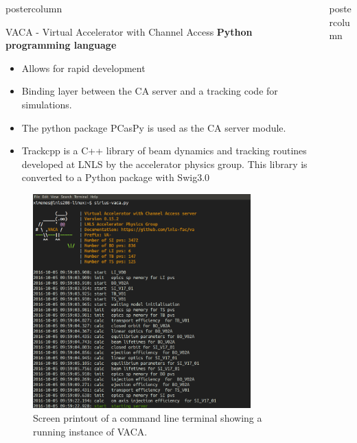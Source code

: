 \documentclass[20pt]{beamer}
\begin{document}
\begin{frame}
\begin{columns}
\begin{column}{0.55\textwidth}
\begin{beamercolorbox}[center]{postercolumn}
\begin{minipage}{.98\textwidth}
{\begin{myblock}{VACA - Virtual Accelerator with Channel Access}
						\textbf{Python programming language}
						\begin{itemize}
							\item Allows for rapid development
							\item Binding layer between the CA server and a tracking code for simulations.
							\item The python package PCasPy is used as the CA server module.
							\item Trackcpp is a C++ library of beam dynamics and tracking routines developed at LNLS by the accelerator physics group. This library is converted to a Python package with Swig3.0						
						\end{itemize}
						\begin{figure}
							\centering
							\includegraphics[width=0.855\textwidth]{../WEPOPRPO21f1.png}
							\caption{Screen printout of a command line terminal showing a running instance of VACA.}%
						\end{figure}
					\end{myblock}
					\vspace{0.5cm}
		}\end{minipage}\end{beamercolorbox}
	\end{column}
	\begin{column}{.45\textwidth}
		\begin{beamercolorbox}[center]{postercolumn}
			\begin{minipage}{.98\textwidth} %

\end{minipage}
\end{beamercolorbox}
\end{column}
\end{columns}
\end{frame}
\end{document}
